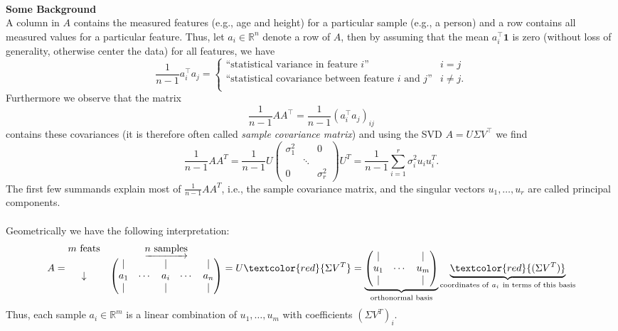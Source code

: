 {\color{navy}
	~\\
	\textbf{Some Background}\\
A column in $A$ contains the measured features (e.g., age and height) for a particular sample (e.g., a person) and a row contains all measured values for a particular feature. Thus, let $a_i \in \mathbb{R}^n$ denote a row of $A$, then by assuming that the mean $a_i^\top \mathbf{1}$ is zero (without loss of generality, otherwise center the data) for all features, we have
$$\frac{1}{n-1}a_i^\top a_j = \begin{cases}
\text{``statistical variance in feature $i$''} & i=j\\
\text{``statistical covariance between feature $i$ and $j$''} & i\neq j.\\
\end{cases}$$
Furthermore we observe that the matrix $$\frac{1}{n-1} AA^\top = \frac{1}{n-1}\left(a_i^\top a_j\right)_{ij} $$ contains these covariances (it is therefore often called \textit{sample covariance matrix}) and using the SVD $A=U\Sigma V^\top$ we find
$$
\frac{1}{n-1}AA^T=\frac{1}{n-1}U\begin{pmatrix}
\sigma_1^2&~&0\\~&\ddots&~\\0&~&\sigma_r^2
\end{pmatrix}U^T=\frac{1}{n-1}\sum_{i=1}^r \sigma_i^2u_iu_i^T.
$$
The first few summands explain most of $\frac{1}{n-1}AA^T$, i.e., the sample covariance matrix, and the singular vectors $u_1,\dots,u_r$ are called principal components.\\~\\
Geometrically we have the following interpretation:
$$
A=\begin{matrix}
m~\text{feats}&\underrightarrow{n~\text{samples}}\\
\downarrow&\begin{pmatrix}
|&~&|&~&|\\
a_1&\cdots&a_i&\cdots&a_n\\
|&~&|&~&|
\end{pmatrix}
\end{matrix}
=U\textcolor{red}{\Sigma V^T}
=\underbrace{\begin{pmatrix}
	|&~&|\\u_1&\cdots&u_m\\|&~&|
	\end{pmatrix}}_{\text{orthonormal basis}}
\underbrace{\textcolor{red}{(\Sigma V^T)}}_{\text{coordinates of}~a_i~\text{in terms of this basis}}
$$
Thus, each sample $a_i\in\mathbb{R}^m$ is a linear combination of $u_1,\dots,u_m$ with coefficients $(\Sigma V^T)_i$.\\~\\
}
